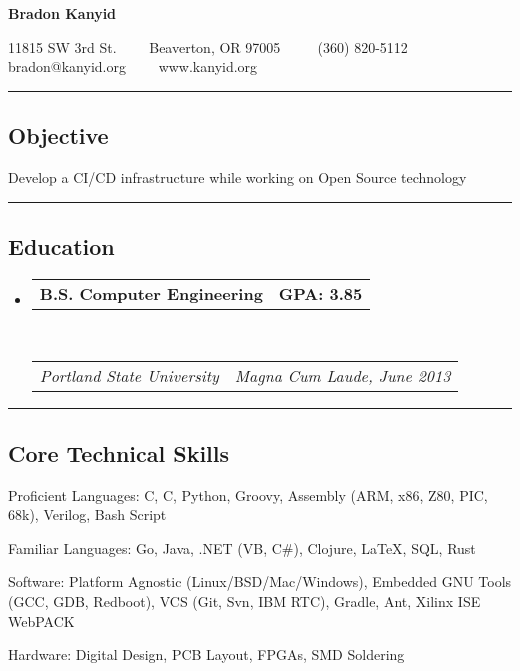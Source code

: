\documentclass[10pt,letterpaper]{article}
\makeatletter
\newenvironment{indentsection}[1]%
{\begin{list}{}%
	{\setlength{\leftmargin}{#1}}%
	\item[]%
}
{\end{list}}
\newcommand{\headerrow}[2]
{\begin{tabular*}{\linewidth}{l@{\extracolsep{\fill}}r}
	#1 &
	#2 \\
\end{tabular*}}
\newcommand{\CPP}
{C\nolinebreak[4]\hspace{-.05em}\raisebox{.22ex}{\footnotesize\bf ++}}
\makeatother
\begin{document}
\begin{center}
{\LARGE \textbf{Bradon Kanyid}}

11815 SW 3rd St.\ \ \textbullet
\ \ Beaverton, OR 97005 \ \ \textbullet
\ \ (360) 820-5112\\
bradon@kanyid.org\ \ \textbullet
\ \ www.kanyid.org
\end{center}

\hrule
\vspace{-0.4em}
\subsection*{Objective}
\begin{indentsection}{\parindent}
\begin{description*}
	\item Develop a CI/CD infrastructure while working on Open Source technology
\end{description*}
\end{indentsection}
\vspace{1em}

\hrule
\vspace{-0.4em}
\subsection*{Education}

\begin{itemize}
	\parskip=0.1em

	\item 
	\headerrow
        {\textbf{B.S. Computer Engineering}}
		{\textbf{GPA: 3.85}}
	\\
	\headerrow
		{\emph{Portland State University}}
		{\emph{Magna Cum Laude, June 2013}}
\end{itemize}
\vspace{1em}

\hrule
\vspace{-0.4em}
\subsection*{Core Technical Skills}

\begin{indentsection}{\parindent}
\begin{description*}
	\item[Proficient Languages:]
    C, \CPP, Python, Groovy, Assembly (ARM, x86, Z80, PIC, 68k), Verilog, Bash Script 
	\item[Familiar Languages:]
    Go, Java, .NET (VB, C\#), Clojure, \LaTeX, SQL, Rust
	\item[Software:]
    Platform Agnostic (Linux/BSD/Mac/Windows), Embedded GNU Tools (GCC, GDB, Redboot), VCS (Git, Svn, IBM RTC), Gradle, Ant, Xilinx ISE WebPACK
	\item[Hardware:]
    Digital Design, PCB Layout, FPGAs, SMD Soldering 
\end{description*}
\end{indentsection}
\vspace{1em}
\end{document}

